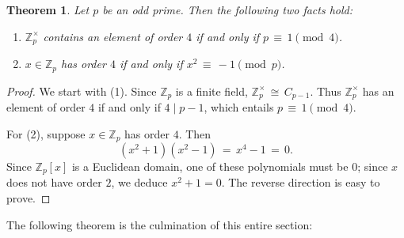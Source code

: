 \documentclass[11pt]{article}
\newtheorem{theorem}{Theorem}
\begin{document}
\begin{adjustwidth}{0.5cm}{}
  \begin{theorem}
    Let $p$ be an odd prime. Then the following two facts hold:
    \begin{enumerate}
      \item $\mathbb{Z}_{p}^{\times}$ contains an element of order $4$ if and only if $p \, \equiv \, 1 \pmod{4}$.
      \item $x \in \mathbb{Z}_{p}$ has order $4$ if and only if $x^{2} \, \equiv \, -1 \pmod{p}$.
    \end{enumerate}
  \end{theorem}
  \begin{proof}
    We start with (1). Since $\mathbb{Z}_{p}$ is a finite field, $\mathbb{Z}_{p}^{\times} \, \cong \, C_{p - 1}$. Thus $\mathbb{Z}_{p}^{\times}$ has an element of order $4$ if and only if $4 \mid p - 1$, which entails $p \, \equiv \, 1 \pmod{4}$.

    For (2), suppose $x \in \mathbb{Z}_{p}$ has order $4$. Then
    \[
      (x^{2} + 1)(x^{2} - 1) \, = \, x^{4} - 1 \, = \, 0.
    \]
    Since $\mathbb{Z}_{p}[x]$ is a Euclidean domain, one of these polynomials must be $0$; since $x$ does not have order $2$, we deduce $x^{2} + 1 = 0$. The reverse direction is easy to prove.
  \end{proof}
\end{adjustwidth}

The following theorem is the culmination of this entire section:
\end{document}

